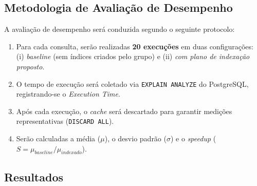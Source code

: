 \documentclass[12pt]{article}
\begin{document}
\subsection{Metodologia de Avaliação de Desempenho}
\label{subsec:metodologia-desempenho}

A avaliação de desempenho será conduzida segundo o seguinte protocolo:
\begin{enumerate}[leftmargin=2cm]
    \item Para cada consulta, serão realizadas \textbf{20 execuções} em duas
          configurações: (i) \emph{baseline} (sem índices criados pelo grupo)
          e (ii) \emph{com plano de indexação proposto}.
    \item O tempo de execução será coletado via \texttt{EXPLAIN ANALYZE} do
          PostgreSQL, registrando-se o \emph{Execution Time}.
    \item Após cada execução, o \emph{cache} será descartado para garantir
          medições representativas (\texttt{DISCARD ALL}).
    \item Serão calculadas a média ($\mu$), o desvio padrão ($\sigma$) e o
          \emph{speedup} ($S = \mu_{baseline} / \mu_{indexado}$).
\end{enumerate}

\subsection{Resultados}
\label{subsec:resultados}
\end{document}
